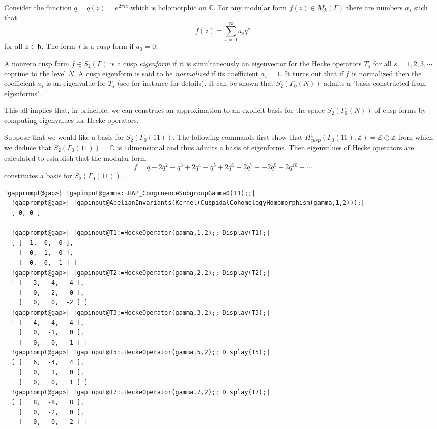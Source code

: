 \documentclass[a4paper,11pt]{report}
\begin{document}
{{Consider the function $q=q(z)=e^{2\pi i z}$ which is holomorphic on $\mathbb C$. For any modular form $f(z) \in M_k(\Gamma)$ there are numbers $a_s$ such that 
\[f(z) = \sum_{s=0}^\infty a_sq^s \]
 for all $z\in {\frak h}$. The form $f$ is a cusp form if $a_0=0$. 

 A non\texttt{}zero cusp form $f\in S_2(\Gamma)$ is a cusp \emph{eigenform} if it is simultaneously an eigenvector for the Hecke operators $T_s$ for all $s =1,2,3,\cdots$ coprime to the level $N$. A cusp eigenform is said to be \emph{normalized} if its coefficient $a_1=1$. It turns out that if $f$ is normalized then the coefficient $a_s$ is an eigenvalue for $T_s$ (see for instance \cite{stein} for details). It can be shown \cite{atkinlehner} that $S_2(\Gamma_0(N))$ admits a "basis constructed from eigenforms". 

 This all implies that, in principle, we can construct an approximation to an
explicit basis for the space $S_2(\Gamma_0(N))$ of cusp forms by computing eigenvalues for Hecke operators. 

 Suppose that we would like a basis for $S_2(\Gamma_0(11))$. The following commands first show that $H^1_{cusp}(\Gamma_0(11),\mathbb Z)=\mathbb Z\oplus \mathbb Z$ from which we deduce that $S_2(\Gamma_0(11)) =\mathbb C$ is $1$\texttt{}dimensional and thus admits a basis of eigenforms. Then
eigenvalues of Hecke operators are calculated to establish that the modular
form 
\[f = q -2q^2 -q^3 +2q^4 +q^5 +2q^6 -2q^7 + -2q^9 -2q^{10} + \cdots \]
 constitutes a basis for $S_2(\Gamma_0(11))$. 
\begin{Verbatim}[commandchars=!@|,fontsize=\small,frame=single,label=Example]
  !gapprompt@gap>| !gapinput@gamma:=HAP_CongruenceSubgroupGamma0(11);;|
  !gapprompt@gap>| !gapinput@AbelianInvariants(Kernel(CuspidalCohomologyHomomorphism(gamma,1,2)));|
  [ 0, 0 ]
  
  !gapprompt@gap>| !gapinput@T1:=HeckeOperator(gamma,1,2);; Display(T1);|
  [ [  1,  0,  0 ],
    [  0,  1,  0 ],
    [  0,  0,  1 ] ]
  !gapprompt@gap>| !gapinput@T2:=HeckeOperator(gamma,2,2);; Display(T2);|
  [ [   3,  -4,   4 ],
    [   0,  -2,   0 ],
    [   0,   0,  -2 ] ]
  !gapprompt@gap>| !gapinput@T3:=HeckeOperator(gamma,3,2);; Display(T3);|
  [ [   4,  -4,   4 ],
    [   0,  -1,   0 ],
    [   0,   0,  -1 ] ]
  !gapprompt@gap>| !gapinput@T5:=HeckeOperator(gamma,5,2);; Display(T5);|
  [ [   6,  -4,   4 ],
    [   0,   1,   0 ],
    [   0,   0,   1 ] ]
  !gapprompt@gap>| !gapinput@T7:=HeckeOperator(gamma,7,2);; Display(T7);|
  [ [   8,  -8,   8 ],
    [   0,  -2,   0 ],
    [   0,   0,  -2 ] ]
  

\end{Verbatim}}}
\end{document}
